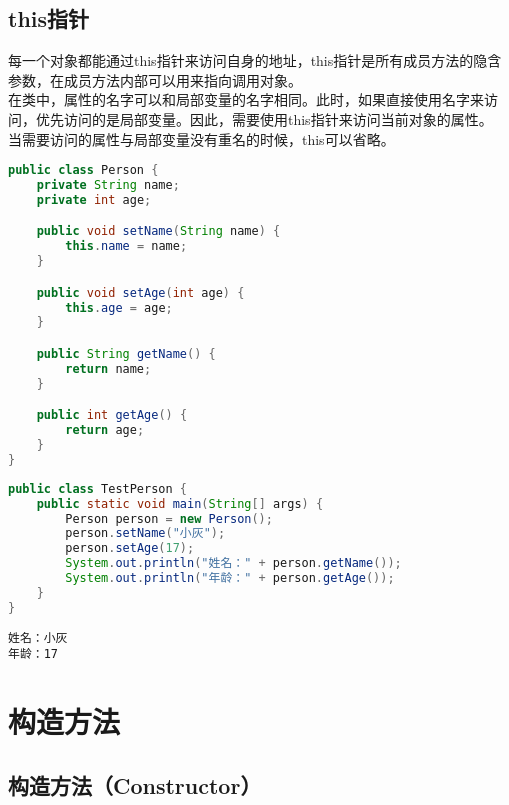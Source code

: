 \subsection{this指针}

每一个对象都能通过this指针来访问自身的地址，this指针是所有成员方法的隐含参数，在成员方法内部可以用来指向调用对象。\\

在类中，属性的名字可以和局部变量的名字相同。此时，如果直接使用名字来访问，优先访问的是局部变量。因此，需要使用this指针来访问当前对象的属性。\\

当需要访问的属性与局部变量没有重名的时候，this可以省略。\\


\begin{lstlisting}[language=Java, title=Person.java]
public class Person {
    private String name;
    private int age;

    public void setName(String name) {
        this.name = name;
    }

    public void setAge(int age) {
        this.age = age;
    }

    public String getName() {
        return name;
    }

    public int getAge() {
        return age;
    }
}
\end{lstlisting}

\begin{lstlisting}[language=Java, title=TestPerson.java]
public class TestPerson {
    public static void main(String[] args) {
        Person person = new Person();
        person.setName("小灰");
        person.setAge(17);
        System.out.println("姓名：" + person.getName());
        System.out.println("年龄：" + person.getAge());
    }
}
\end{lstlisting}

\begin{tcolorbox}
	\begin{verbatim}
姓名：小灰
年龄：17
	\end{verbatim}
\end{tcolorbox}

\newpage

\section{构造方法}

\subsection{构造方法（Constructor）}


